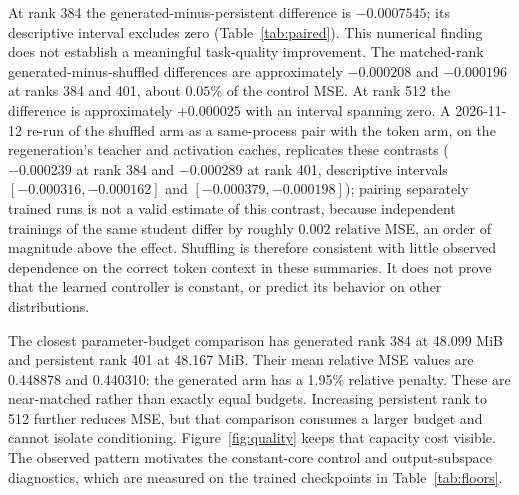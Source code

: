 \begin{table}[t]
\centering\small
\caption{Archived layer reconstruction: mean $\pm$ sample standard deviation
across four training-seed records. Lower MSE is better. Storage includes
factors and, when applicable, the controller under the stated $h=192$
assumption. The rows recompute the archived per-seed records; the 2026-11-10
four-seed regeneration re-executed the same protocol end to end and matched
these cells within $0.009$ relative MSE, so the table values are reproduced
arithmetic rather than newly claimed measurements.}
\label{tab:quality}

\end{table}

At rank 384 the generated-minus-persistent difference is $-0.0007545$;
its descriptive interval excludes zero (Table~\ref{tab:paired}). This numerical
finding does not establish a meaningful task-quality improvement. The
matched-rank generated-minus-shuffled differences are approximately $-0.000208$
and $-0.000196$ at ranks 384 and 401, about $0.05\%$ of the control MSE.
At rank 512 the difference is approximately $+0.000025$ with an interval spanning zero.
A 2026-11-12 re-run of the shuffled arm as a same-process pair with the
token arm, on the regeneration's teacher and activation caches,
replicates these contrasts ($-0.000239$ at rank 384 and $-0.000289$ at
rank 401, descriptive intervals $[-0.000316,-0.000162]$ and
$[-0.000379,-0.000198]$); pairing separately trained runs is not a
valid estimate of this contrast, because independent trainings of the
same student differ by roughly $0.002$ relative MSE, an order of
magnitude above the effect.
Shuffling is therefore consistent with little observed dependence on the
correct token context in these summaries. It does not prove that the learned
controller is constant, or predict its behavior on other distributions.

\begin{table}[t]
\centering\small
\caption{Paired generated-minus-control MSE contrasts. Negative values favor
the generated arm. Intervals are descriptive and unadjusted; four records do
not certify equivalence, generalization, or independence.}
\label{tab:paired}

\end{table}

The closest parameter-budget comparison has generated rank 384 at 48.099 MiB
and persistent rank 401 at 48.167 MiB. Their mean relative MSE values are
0.448878 and 0.440310: the generated arm has a 1.95\% relative penalty.
These are near-matched rather than exactly equal budgets. Increasing persistent
rank to 512 further reduces MSE, but that comparison consumes a larger budget
and cannot isolate conditioning. Figure~\ref{fig:quality} keeps that capacity
cost visible. The observed pattern motivates the constant-core control and
output-subspace diagnostics, which are measured on the trained checkpoints in
Table~\ref{tab:floors}.


